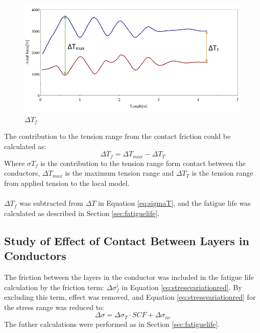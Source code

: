 \begin{figure}[H]
\centering
\includegraphics[scale=0.7]{figures/confric.PNG}
\caption[$\; \:$ $\Delta T_f$]{$\Delta T_f$}
 \label{fig:condfric}
\end{figure}
The contribution to the tension range from the contact friction could be calculated as:
\begin{equation}
    \Delta T_f = \Delta T_{max} - \Delta T_T
\end{equation}
Where $\sigma T_f$ is the contribution to the tension range form contact between the conductors, $\Delta T_{max}$ is the maximum tension range and $\Delta T_T$ is the tension range from applied tension to the local model.\\\\
$\Delta T_f$ was subtracted from $\Delta T$ in Equation \ref{eq:sigmaT}, and the fatigue life was calculated as described in Section \ref{sec:fatiguelife}.

\subsection{Study of Effect of Contact Between Layers in Conductors}
The friction between the layers in the conductor was included in the fatigue life calculation by the friction term: $\Delta \sigma_f^i$ in Equation \ref{eq:stressvariationred}. By excluding this term, effect was removed, and Equation \ref{eq:stressvariationred} for the stress range was reduced to:
\begin{equation}
    \Delta \sigma=\Delta \sigma_T \cdot SCF + \Delta \sigma_{nc}
\end{equation}
The futher calculations were performed as in Section \ref{sec:fatiguelife}.




